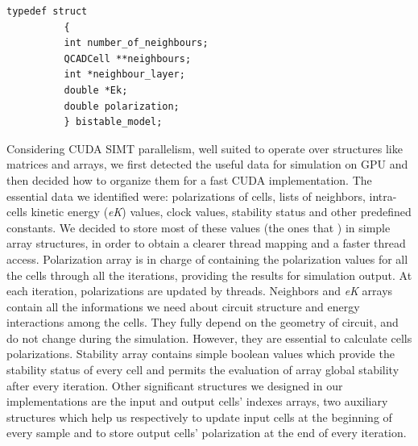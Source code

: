 \begin{lstlisting}[caption=Bistable model structure for the QCACell, label=bistable_struct]
	    typedef struct
	      {
	      int number_of_neighbours;
	      QCADCell **neighbours;
	      int *neighbour_layer;
	      double *Ek;
	      double polarization;
	      } bistable_model;
\end{lstlisting}

Considering CUDA SIMT parallelism, well suited to operate over structures like matrices and arrays, we first detected the useful data
for simulation on GPU and then decided how to organize them for a fast CUDA implementation.\newline
The essential data we identified were: polarizations of cells, lists of neighbors, intra-cells kinetic energy (\textit{eK}) values, clock values,
stability status and other predefined constants.\newline
We decided to store most of these values (the ones that ) in simple array structures, in order to obtain a clearer thread mapping and a faster thread access.\newline
Polarization array is in charge of containing the polarization values for all the cells through all the iterations, providing
the results for simulation output. At each iteration, polarizations are updated by threads.\newline
Neighbors and \textit{eK} arrays contain all the informations we need about circuit structure and energy interactions among
the cells. They fully depend on the geometry of circuit, and do not change during the simulation. However, they are essential to calculate 
cells polarizations.\newline
Stability array contains simple boolean values which provide the stability status of every cell and permits the evaluation of array global
stability after every iteration.\newline
Other significant structures we designed in our implementations are the input and output cells' indexes arrays, two auxiliary structures
which help us respectively to update input cells at the beginning of every sample and to store output cells' polarization at the end of 
every iteration.

